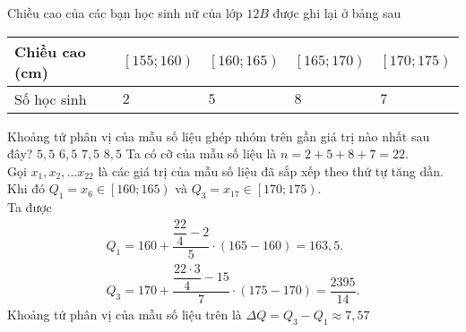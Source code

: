 \begin{ex}%
	Chiều cao của các bạn học sinh nữ của lớp $12B$ được ghi lại ở bảng sau
	\begin{center}
		\begin{tabular}{|w{c}{3cm}|w{c}{2.5cm}|w{c}{2.5cm}|w{c}{2.5cm}|w{c}{2.5cm}|}
			\hline
			Chiều cao (cm) & $\left[155; 160 \right)$ & $\left[160; 165 \right)$ & $\left[165; 170 \right)$ & $\left[170; 175 \right)$ \\
			\hline
			Số học sinh & $2$ & $5$ & $8$ & $7$ \\
			\hline
		\end{tabular}
	\end{center}
	Khoảng tứ phân vị của mẫu số liệu ghép nhóm trên gần giá trị nào nhất sau đây?
	\choice
	{$5{,}5$}
	{$6{,}5$}
	{\True $7{,}5$}
	{$8{,}5$}
	\loigiai
	{
	Ta có cỡ của mẫu số liệu là $n = 2 + 5 + 8 + 7 = 22$.\\
	Gọi $x_1, x_2, \ldots x_{22}$ là các giá trị của mẫu số liệu đã sắp xếp theo thứ tự tăng dần.\\
	Khi đó $Q_1 = x_6 \in \left[160; 165 \right)$ và $Q_3 = x_{17} \in \left[170; 175 \right)$.\\
	Ta được \begin{align*}
		Q_1 = 160 + \dfrac{\dfrac{22}{4} - 2}{5} \cdot \left(165 - 160 \right) = 163{,}5.\\
		Q_3 = 170 + \dfrac{\dfrac{22 \cdot 3}{4} - 15}{7} \cdot \left(175 - 170 \right) = \dfrac{2395}{14}.
	\end{align*}
	Khoảng tứ phân vị của mẫu số liệu trên là $\Delta Q = Q_3 - Q_1 \approx 7{,}57$
	}
\end{ex}


